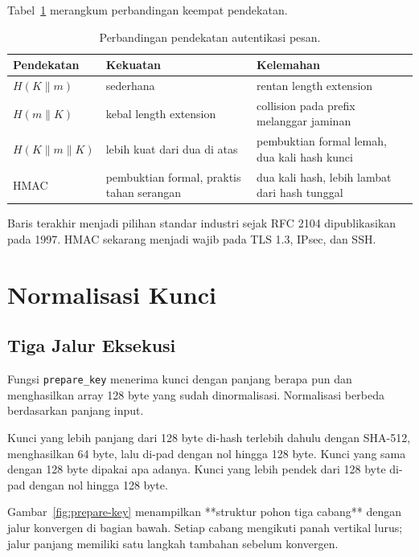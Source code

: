 \documentclass[11pt,a4paper]{article}
\begin{document}
Tabel~\ref{tab:naive-vs-hmac} merangkum perbandingan keempat pendekatan.

\begin{table}[H]
	\centering
	\caption{Perbandingan pendekatan autentikasi pesan.}
	\label{tab:naive-vs-hmac}
	\footnotesize
	\begin{tabularx}{\textwidth}{l X X}
		\toprule
		Pendekatan                     & Kekuatan                                  & Kelemahan                                     \\
		\midrule
		$H(K \parallel m)$             & sederhana                                 & rentan length extension                       \\
		$H(m \parallel K)$             & kebal length extension                    & collision pada prefix melanggar jaminan       \\
		$H(K \parallel m \parallel K)$ & lebih kuat dari dua di atas               & pembuktian formal lemah, dua kali hash kunci  \\
		HMAC                           & pembuktian formal, praktis tahan serangan & dua kali hash, lebih lambat dari hash tunggal \\
		\bottomrule
	\end{tabularx}
\end{table}

Baris terakhir menjadi pilihan standar industri sejak RFC 2104 dipublikasikan pada 1997. HMAC sekarang menjadi wajib pada TLS 1.3, IPsec, dan SSH.

\section{Normalisasi Kunci}

\subsection{Tiga Jalur Eksekusi}

Fungsi \texttt{prepare\_key} menerima kunci dengan panjang berapa pun dan menghasilkan array 128 byte yang sudah dinormalisasi. Normalisasi berbeda berdasarkan panjang input.

Kunci yang lebih panjang dari 128 byte di-hash terlebih dahulu dengan SHA-512, menghasilkan 64 byte, lalu di-pad dengan nol hingga 128 byte. Kunci yang sama dengan 128 byte dipakai apa adanya. Kunci yang lebih pendek dari 128 byte di-pad dengan nol hingga 128 byte.

Gambar~\ref{fig:prepare-key} menampilkan **struktur pohon tiga cabang** dengan jalur konvergen di bagian bawah. Setiap cabang mengikuti panah vertikal lurus; jalur panjang memiliki satu langkah tambahan sebelum konvergen.
\end{document}
